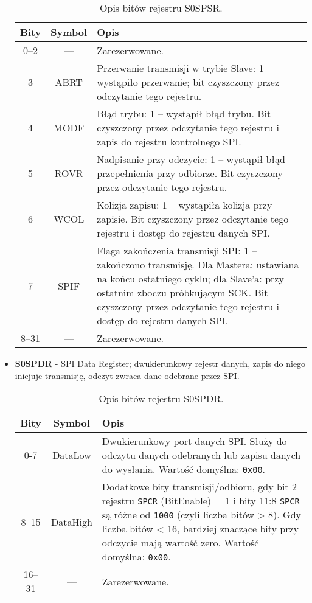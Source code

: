 \begin{itemize}
\begin{table}[H]
\centering
\caption{Opis bitów rejestru S0SPSR.}
\vspace{0.5em}
\renewcommand{\arraystretch}{1.2}
\begin{tabular}{|c|c|p{9.5cm}|}
\hline
\textbf{Bity} & \textbf{Symbol} & \textbf{Opis} \\
\hline
0–2     & —        & Zarezerwowane.\\
\hline
3       & ABRT     & Przerwanie transmisji w trybie Slave: 1 – wystąpiło przerwanie; bit czyszczony przez odczytanie tego rejestru. \\
\hline
4       & MODF     & Błąd trybu: 1 – wystąpił błąd trybu. Bit czyszczony przez odczytanie tego rejestru i zapis do rejestru kontrolnego SPI. \\
\hline
5       & ROVR     & Nadpisanie przy odczycie: 1 – wystąpił błąd przepełnienia przy odbiorze. Bit czyszczony przez odczytanie tego rejestru. \\
\hline
6       & WCOL     & Kolizja zapisu: 1 – wystąpiła kolizja przy zapisie. Bit czyszczony przez odczytanie tego rejestru i dostęp do rejestru danych SPI. \\
\hline
7       & SPIF     & Flaga zakończenia transmisji SPI: 1 – zakończono transmisję. Dla Mastera: ustawiana na końcu ostatniego cyklu; dla Slave’a: przy ostatnim zboczu próbkującym SCK. Bit czyszczony przez odczytanie tego rejestru i dostęp do rejestru danych SPI. \\
\hline
8–31    & —        & Zarezerwowane.\\
\hline
\end{tabular}
\end{table}

    
    \item \textbf{S0SPDR} - SPI Data Register; dwukierunkowy rejestr danych, zapis do niego inicjuje transmisję, odczyt zwraca dane odebrane przez SPI.

\begin{table}[H]
\centering
\caption{Opis bitów rejestru S0SPDR.}
\vspace{0.5em}
\renewcommand{\arraystretch}{1.2}
\begin{tabular}{|c|c|p{9.5cm}|}
\hline
\textbf{Bity} & \textbf{Symbol} & \textbf{Opis} \\
\hline
0-7     & DataLow  & Dwukierunkowy port danych SPI. Służy do odczytu danych odebranych lub zapisu danych do wysłania. \newline Wartość domyślna: \texttt{0x00}. \\
\hline
8–15    & DataHigh & Dodatkowe bity transmisji/odbioru, gdy bit 2 rejestru \texttt{SPCR} (BitEnable) = 1 i bity 11:8 \texttt{SPCR} są różne od \texttt{1000} (czyli liczba bitów > 8). \newline Gdy liczba bitów < 16, bardziej znaczące bity przy odczycie mają wartość zero. \newline Wartość domyślna: \texttt{0x00}. \\
\hline
16–31   & —         & Zarezerwowane. \\
\hline
\end{tabular}
\end{table}


\end{itemize}
